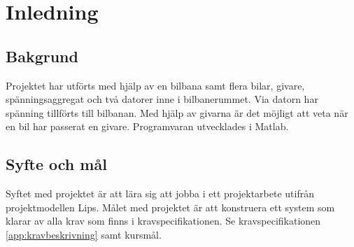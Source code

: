 \section{Inledning}

\subsection{Bakgrund} Projektet har utförts med hjälp av en bilbana samt
flera bilar, givare, spänningsaggregat och två datorer inne i bilbanerummet. Via datorn har spänning tillförts till bilbanan. Med hjälp av givarna är
det möjligt att veta när en bil har passerat en givare.  Programvaran utvecklades
i Matlab.

\subsection{Syfte och mål}

Syftet med projektet är att lära sig att jobba i ett projektarbete utifrån projektmodellen Lips. Målet med projektet är att konstruera ett system som klarar av alla krav som finns i kravspecifikationen. Se kravspecifikationen \ref{app:kravbeskrivning} samt kursmål.